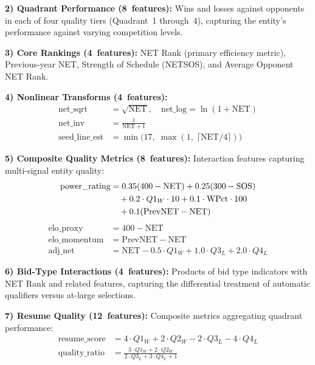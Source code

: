 \documentclass[conference]{IEEEtran}
\begin{document}
\textbf{2) Quadrant Performance (8~features):} Wins and losses against opponents in each of four quality tiers (Quadrant~1 through~4), capturing the entity's performance against varying competition levels.

\textbf{3) Core Rankings (4~features):} NET Rank (primary efficiency metric), Previous-year NET, Strength of Schedule (NETSOS), and Average Opponent NET Rank.

\textbf{4) Nonlinear Transforms (4~features):}
\begin{align}
\text{net\_sqrt} &= \sqrt{\text{NET}},\quad \text{net\_log} = \ln(1 + \text{NET}) \label{eq:nl1}\\
\text{net\_inv} &= \frac{1}{\text{NET} + 1} \label{eq:nl2}\\
\text{seed\_line\_est} &= \min\!\bigl(17,\; \max(1,\; \lceil \text{NET}/4 \rceil)\bigr) \label{eq:nl3}
\end{align}

\textbf{5) Composite Quality Metrics (8~features):} Interaction features capturing multi-signal entity quality:
\begin{align}
\text{power\_rating} &= 0.35(400 - \text{NET}) + 0.25(300 - \text{SOS}) \notag \\
&\quad + 0.2 \cdot Q1_W \cdot 10 + 0.1 \cdot \text{WPct} \cdot 100 \notag \\
&\quad + 0.1(\text{PrevNET} - \text{NET}) \label{eq:power_rating}
\end{align}
\begin{align}
\text{elo\_proxy} &= 400 - \text{NET} \label{eq:elo_proxy}\\
\text{elo\_momentum} &= \text{PrevNET} - \text{NET} \label{eq:elo_momentum}\\
\text{adj\_net} &= \text{NET} - 0.5 \cdot Q1_W + 1.0 \cdot Q3_L + 2.0 \cdot Q4_L \label{eq:adj_net}
\end{align}

\textbf{6) Bid-Type Interactions (4~features):} Products of bid type indicators with NET Rank and related features, capturing the differential treatment of automatic qualifiers versus at-large selections.

\textbf{7) Resume Quality (12~features):} Composite metrics aggregating quadrant performance:
\begin{align}
\text{resume\_score} &= 4 \cdot Q1_W + 2 \cdot Q2_W - 2 \cdot Q3_L - 4 \cdot Q4_L \label{eq:resume}\\
\text{quality\_ratio} &= \frac{3 \cdot Q1_W + 2 \cdot Q2_W}{2 \cdot Q3_L + 3 \cdot Q4_L + 1} \label{eq:quality_ratio}
\end{align}
\end{document}
